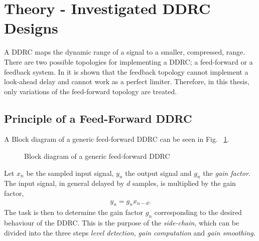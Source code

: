 \documentclass[../main2.tex]{subfiles}
\providecommand{\rootdir}{..}
\begin{document}
\FloatBarrier
\section{Theory - Investigated DDRC Designs} \label{theory_DDRC}
A DDRC maps the dynamic range of a signal to a smaller, compressed, range. There are two possible topologies for implementing a DDRC; a feed-forward or a feedback system. In \cite{reiss2012tutorial} it is shown that the feedback topology cannot implement a look-ahead delay and cannot work as a perfect limiter. Therefore, in this thesis, only variations of the feed-forward topology are treated. 

\subsection{Principle of a Feed-Forward DDRC}
A Block diagram of a generic feed-forward DDRC can be seen in Fig. ~\ref{fig:block_genericDDRC}.
\begin{figure}[h]
\centerline{}
\caption{Block diagram of a generic feed-forward DDRC}
\label{fig:block_genericDDRC}
\end{figure}

Let $x_n$ be the sampled input signal, $y_n$ the output signal and $g_n$ the \emph{gain factor}. The input signal, in general delayed by $d$ samples, is multiplied by the gain factor,
\begin{align}
y_n = g_nx_{n-d}.
\label{eq:gainfactor}
\end{align}
The task is then to determine the gain factor $g_n$ corresponding to the desired behaviour of the DDRC. This is the purpose of the \emph{side-chain}, which can be divided into the three steps \emph{level detection}, \emph{gain computation} and \emph{gain smoothing}.






\end{document}
